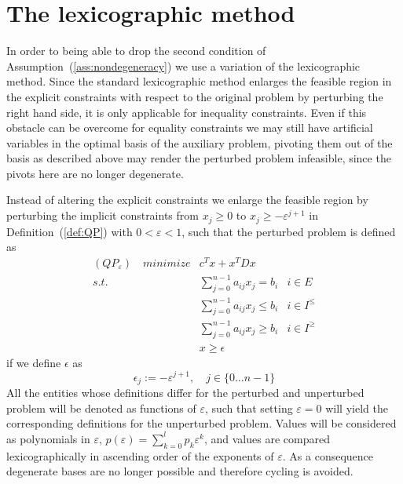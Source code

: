 \documentclass[a4paper]{article}
\begin{document}
\section{The lexicographic method}
In order to being able to drop the second condition of
Assumption~(\ref{ass:nondegeneracy}) we use a variation of the lexicographic
method. Since the standard lexicographic method enlarges the feasible region
in the explicit constraints with respect to the original problem by perturbing
the right hand side, it is only applicable for inequality
constraints. Even if this obstacle can be overcome for equality constraints we
may still have artificial variables in the optimal basis of the auxiliary
problem, pivoting them out of the basis as described above may render the
perturbed problem infeasible, since the pivots here are no longer degenerate.

Instead of altering the explicit constraints we enlarge the feasible region by
perturbing the implicit constraints from $x_{j} \geq 0$ to $x_{j} \geq
-\varepsilon^{j +1}$ in Definition~(\ref{def:QP}) with $0 < \varepsilon < 1$,
such that the perturbed problem is defined as
\begin{eqnarray}
\label{def:QP_eps}
(QP_{\varepsilon})\quad minimize&  c^{T}x + x^{T} D x   & \nonumber \\
s.t.	 & \sum_{j=0}^{n-1}a_{ij}x_{j} = b_{i}	& i \in E \nonumber \\
	 & \sum_{j=0}^{n-1}a_{ij}x_{j} \leq b_{i} & i \in I^{\leq} \\
	 & \sum_{j=0}^{n-1}a_{ij}x_{j} \geq b_{i} & i \in I^{\geq} \nonumber \\
	 & x \geq \epsilon				& \nonumber  
\end{eqnarray}
if we define $\epsilon$ as
\begin{equation}
\label{def:epsilon}
\epsilon_{j}:= -\varepsilon^{j+1}, \quad j \in \{0 \dots n-1 \}
\end{equation}
All the entities whose definitions differ for the perturbed and
unperturbed problem  will be denoted as functions of $\varepsilon$,
such that setting $\varepsilon =0$ will yield the corresponding definitions
for the unperturbed problem.
Values will be considered as polynomials in $\varepsilon$,
$p(\varepsilon)=\sum_{k=0}^{l}p_{k}\varepsilon^{k}$, and values are compared
lexicographically in ascending order of the exponents of $\varepsilon$. As
a consequence degenerate bases are no longer possible and therefore cycling is
avoided.   
\end{document}
